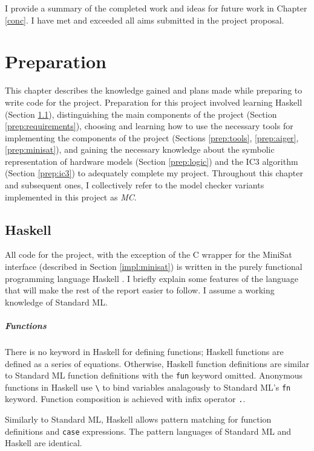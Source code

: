 \documentclass[12pt,a4paper,twoside,openright]{report}
\begin{document}
I provide a summary of the completed work and ideas for
future work in Chapter \ref{conc}. %
I have met and exceeded all aims submitted in the project proposal.

\chapter{Preparation}
\label{prep}

This chapter describes the knowledge gained and plans made while preparing
to write code for the project.
Preparation for this project involved learning
Haskell (Section \ref{prep:haskell}),
distinguishing the main components of the project
(Section \ref{prep:requirements}), choosing and learning how to use
the necessary tools for implementing the components of the project
(Sections \ref{prep:tools}, \ref{prep:aiger}, \ref{prep:minisat}),
and gaining the necessary knowledge about the symbolic representation
of hardware models
(Section \ref{prep:logic}) and the IC3 algorithm (Section \ref{prep:ic3}) to
adequately complete my project.
Throughout this chapter and subsequent ones, I collectively refer to the model checker
variants implemented in this project as \emph{MC}.

\section{Haskell}
\label{prep:haskell}

All code for the project, with the exception of the C wrapper for the
MiniSat interface (described in Section \ref{impl:minisat})
is written in the purely functional
programming language Haskell \cite{haskell}.
I briefly explain some features of the
language that will make the rest of the report easier to follow.
I assume a working knowledge of Standard ML.

\paragraph{Functions}{
There is no keyword in Haskell for defining functions;
Haskell functions are defined as a series of equations. Otherwise,
Haskell function definitions are similar to Standard ML function definitions with the
\verb,fun, keyword omitted. Anonymous functions in Haskell
use \verb,\, to bind variables analagously to Standard
ML's \verb,fn, keyword. Function composition is achieved with infix operator
\verb,.,.

Similarly to Standard ML, Haskell allows pattern matching
for function definitions and \verb,case, expressions. The pattern languages of Standard
ML and Haskell are identical.
}
\end{document}
